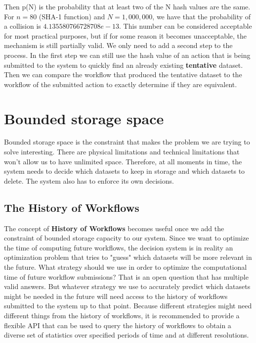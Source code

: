 Then p(N) is the probability that at least two of the N hash values are the same.  For $n=80$ (SHA-1 function) and $N=1,000,000$, we have that the probability of a collision is $4.135580766728708e-13$.  This number can be considered acceptable for most practical purposes, but if for some reason it becomes unacceptable, the mechanism is still partially valid.  We only need to add a second step to the process.  In the first step we can still use the hash value of an action that is being submitted to the system to quickly find an already existing \textbf{tentative} dataset. Then we can compare the workflow that produced the tentative dataset to the workflow of the submitted action to exactly determine if they are equivalent.

\section{Bounded storage space}
Bounded storage space is the constraint that makes the problem we are trying to solve interesting. There are physical limitations and technical limitations that won't allow us to have unlimited space.  Therefore, at all moments in time, the system needs to decide which datasets to keep in storage and which datasets to delete.  The system also has to enforce its own decisions.

\subsection{The History of Workflows}
The concept of \textbf{History of Workflows} becomes useful once we add the constraint of bounded storage capacity to our system. Since we want to optimize the time of computing future workflows, the decision system is in reality an optimization problem that tries to "guess" which datasets will be more relevant in the future. What strategy should we use in order to optimize the computational time of future workflow submissions?  That is an open question that has multiple valid answers.  But whatever strategy we use to accurately predict which datasets might be needed in the future will need access to the history of workflows submitted to the system up to that point.  Because different strategies might need different things from the history of workflows, it is recommended to provide a flexible API that can be used to query the history of workflows to obtain a diverse set of statistics over specified periods of time and at different resolutions.

